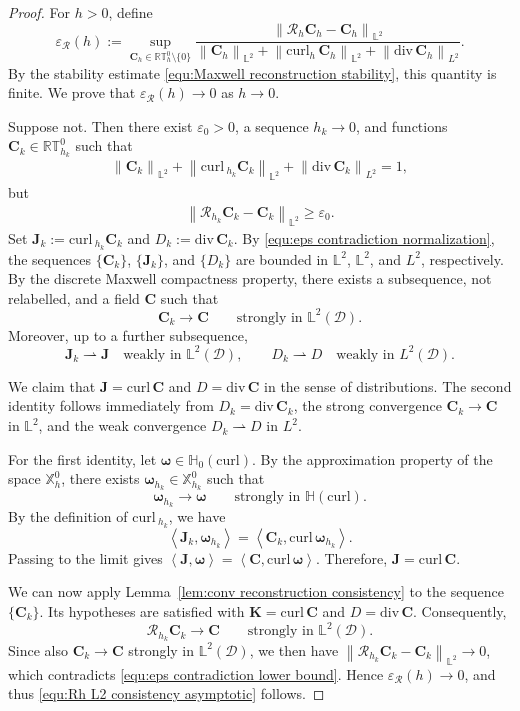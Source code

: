 \documentclass[11pt, reqno]{amsart}
\theoremstyle{definition}
\numberwithin{equation}{section}
\newcommand{\curl}{\mathrm{curl}\,}
\newcommand{\divg}{\mathrm{div}\,}
\newcommand{\bff}{\boldsymbol}
\newcommand{\bb}{\mathbb}
\newcommand{\norm}[2]{\left\|{#1}\right\|_{#2}}
\newcommand{\inpro}[2]{\left\langle#1,#2\right\rangle}
\newcommand{\hcurl}{\mathbb{H}(\mathrm{curl})}
\newcommand{\hzerocurl}{\mathbb{H}_0(\mathrm{curl})}
\newcommand{\curlh}{\mathrm{curl}_h\,}
\begin{document}
\begin{proof}
	For \(h>0\), define
	\[
	\varepsilon_{\mathcal R}(h)
	:=
	\sup_{\bff C_h\in\bb{RT}_h^0\setminus\{0\}}
	\frac{
		\norm{\mathcal R_h\bff C_h-\bff C_h}{\bb L^2}
	}{
		\norm{\bff C_h}{\bb L^2}
		+
		\norm{\curlh\bff C_h}{\bb L^2}
		+
		\norm{\divg\bff C_h}{L^2}
	}.
	\]
	By the stability estimate \eqref{equ:Maxwell reconstruction stability}, this
	quantity is finite. We prove that $\varepsilon_{\mathcal R}(h)\to 0$ as $h\to 0$.
	
	Suppose not. Then there exist \(\varepsilon_0>0\), a sequence \(h_k\to0\),
	and functions \(\bff C_k\in\bb{RT}_{h_k}^0\) such that
	\begin{align}
		\label{equ:eps contradiction normalization}
		\norm{\bff C_k}{\bb L^2}
		+
		\norm{\curl_{h_k}\bff C_k}{\bb L^2}
		+
		\norm{\divg\bff C_k}{L^2}
		=1,
	\end{align}
	but
	\begin{align}
		\label{equ:eps contradiction lower bound}
		\norm{\mathcal R_{h_k}\bff C_k-\bff C_k}{\bb L^2}
		\ge
		\varepsilon_0.
	\end{align}
	Set $\bff J_k:=\curl_{h_k}\bff C_k$ and $D_k:=\divg\bff C_k$.
	By \eqref{equ:eps contradiction normalization}, the sequences
	\(\{\bff C_k\}\), \(\{\bff J_k\}\), and \(\{D_k\}\) are bounded in
	\(\bb L^2\), \(\bb L^2\), and \(L^2\), respectively. By the discrete Maxwell
	compactness property, there exists a subsequence, not relabelled, and a field
	\(\bff C\) such that
	\[
	\bff C_k\to\bff C
	\qquad\text{strongly in }\bb L^2(\mathscr D).
	\]
	Moreover, up to a further subsequence,
	\[
	\bff J_k\rightharpoonup\bff J
	\quad\text{weakly in }\bb L^2(\mathscr D),
	\qquad
	D_k\rightharpoonup D
	\quad\text{weakly in }L^2(\mathscr D).
	\]
	
	We claim that $\bff J=\curl\bff C$ and $D=\divg\bff C$
	in the sense of distributions. The second identity follows immediately from
	\(D_k=\divg\bff C_k\), the strong convergence
	\(\bff C_k\to\bff C\) in \(\bb L^2\), and the weak convergence
	\(D_k\rightharpoonup D\) in \(L^2\).
	
	For the first identity, let $\bff\omega\in \hzerocurl$. By the approximation property of the space $\bb X_h^0$, there exists
	\(\bff\omega_{h_k}\in\bb X_{h_k}^0\) such that
	\[
	\bff\omega_{h_k}\to\bff\omega
	\qquad\text{strongly in } \hcurl.
	\]
	By the definition of $\curl_{h_k}$, we have
	\[
	\inpro{\bff J_k}{\bff\omega_{h_k}}
	=
	\inpro{\bff C_k}{\curl\bff\omega_{h_k}}.
	\]
	Passing to the limit gives $\inpro{\bff J}{\bff\omega}= \inpro{\bff C}{\curl\bff\omega}$.
	Therefore, $\bff J=\curl\bff C$.
	
	We can now apply Lemma~\ref{lem:conv reconstruction consistency} to the
	sequence \(\{\bff C_k\}\). Its hypotheses are satisfied with
	$\bff K=\curl\bff C$ and  $D=\divg\bff C$.
	Consequently,
	\[
	\mathcal R_{h_k}\bff C_k\to\bff C
	\qquad\text{strongly in }\bb L^2(\mathscr D).
	\]
	Since also \(\bff C_k\to\bff C\) strongly in \(\bb L^2(\mathscr D)\), we then have
	$\norm{\mathcal R_{h_k}\bff C_k-\bff C_k}{\bb L^2}\to0$,
	which contradicts \eqref{equ:eps contradiction lower bound}. Hence
	$\varepsilon_{\mathcal R}(h)\to0$, and thus
	\eqref{equ:Rh L2 consistency asymptotic} follows.
\end{proof}
\end{document}
